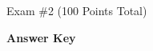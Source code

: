 \documentclass[twoside]{article}
\begin{document}
\begin{EXAM}

\vspace*{-3cm}



\bigskip

\end{EXAM}

\begin{center}
\Large Exam \#2 (100 Points Total) \begin{KEY}\textbf{Answer Key}\end{KEY}
\end{center}
\normalsize 
\bigskip
\end{document}
